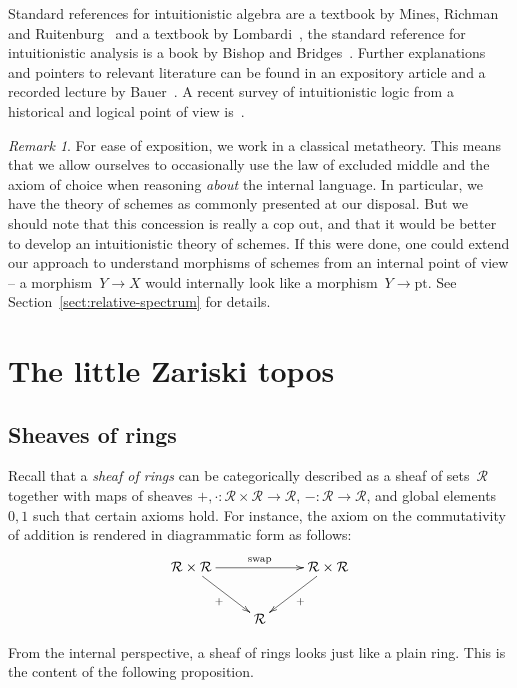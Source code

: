 \documentclass[10pt,reqno,a4paper]{amsbook}
\theoremstyle{definition}
\theoremstyle{plain}
\theoremstyle{remark}
\newtheorem{rem}[defn]{Remark}
\newcommand{\R}{\mathcal{R}}
\newcommand{\pt}{\mathrm{pt}}
\newcommand{\?}{\,{:}\,}
\renewcommand{\_}{\mathpunct{.}\,}
\begin{document}
Standard references for intuitionistic algebra are a textbook by Mines,
Richman and
Ruitenburg~\cite{mines-richman-ruitenburg:constructive-algebra} and a textbook
by Lombardi~\cite{lombardi:quitte:constructive-algebra}, the standard
reference for intuitionistic analysis is a book by Bishop and
Bridges~\cite{bishop-bridges:constructive-analysis}. Further explanations and
pointers to relevant literature can be found in an expository article and a
recorded lecture by Bauer~\cite{bauer:int-mathematics,bauer:video}. A
recent survey of intuitionistic logic from a historical and logical point of
view is~\cite{melikhov:intuitionistic-logic}.

\begin{rem}For ease of exposition, we work in a classical metatheory. This
means that we allow ourselves to occasionally use the law of excluded middle
and the axiom of choice when reasoning \emph{about} the internal language. In
particular, we have the theory of schemes as commonly presented at our
disposal. But we should note that this concession is really a cop out, and that
it would be better to develop an intuitionistic theory of schemes. If this were
done, one could extend our approach to understand morphisms of schemes from an
internal point of view -- a morphism~$Y \to X$ would internally look like a
morphism~$Y \to \pt$. See Section~\ref{sect:relative-spectrum} for details.\end{rem}


\chapter{The little Zariski topos}\label{part:little-zariski}

\section{Sheaves of rings}

Recall that a \emph{sheaf of rings} can be categorically described as a
sheaf of sets~$\R$ together with maps of sheaves $+, \cdot : \R \times \R \to
\R$, $- : \R \to \R$, and global elements~$0, 1$ such that certain axioms hold.
For instance, the axiom on the commutativity of addition is rendered in
diagrammatic form as follows:
\[ \xymatrix{
  \R \times \R \ar[rr]^{\mathrm{swap}} \ar[rd]_{+} && \R \times \R \ar[ld]^{+} \\
  & \R
} \]

From the internal perspective, a sheaf of rings looks just like a plain ring.
This is the content of the following proposition.
\end{document}
